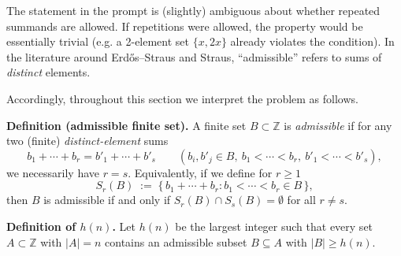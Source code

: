 The statement in the prompt is (slightly) ambiguous about whether repeated summands are allowed.
If repetitions were allowed, the property would be essentially trivial (e.g. a 2-element set
\(\{x,2x\}\) already violates the condition). In the literature around Erd\H{o}s--Straus and Straus,
``admissible'' refers to sums of \emph{distinct} elements.

Accordingly, throughout this section we interpret the problem as follows.

\medskip
\noindent\textbf{Definition (admissible finite set).}
A finite set \(B\subset\mathbb{Z}\) is \emph{admissible} if for any two (finite) \emph{distinct-element} sums
\[
  b_1+\cdots+b_r = b'_1+\cdots+b'_s\qquad (b_i,b'_j\in B,\ b_1<\cdots<b_r,\ b'_1<\cdots<b'_s),
\]
we necessarily have \(r=s\).
Equivalently, if we define for \(r\ge1\)
\[
  S_r(B)\;:=\;\Big\{\, b_1+\cdots+b_r : b_1<\cdots<b_r\in B\,\Big\},
\]
then \(B\) is admissible if and only if \(S_r(B)\cap S_s(B)=\emptyset\) for all \(r\neq s\).

\medskip
\noindent\textbf{Definition of \(h(n)\).}
Let \(h(n)\) be the largest integer such that every set \(A\subset\mathbb{Z}\) with \(|A|=n\)
contains an admissible subset \(B\subseteq A\) with \(|B|\ge h(n)\).
